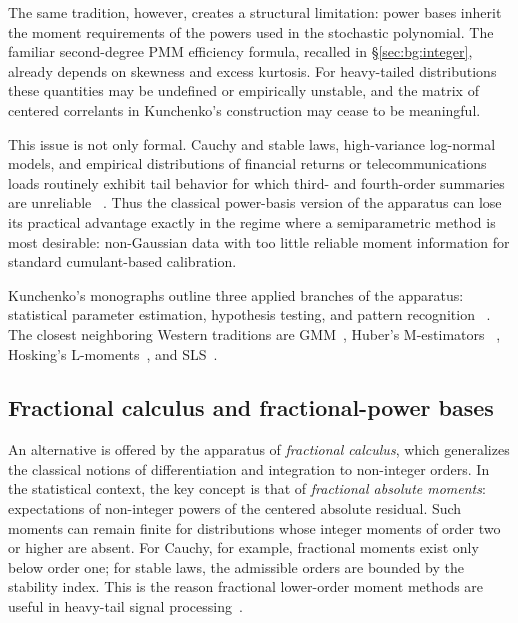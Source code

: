 \documentclass[11pt]{article}
\theoremstyle{definition}
\begin{document}
The same tradition, however, creates a structural limitation: power bases
inherit the moment requirements of the powers used in the stochastic
polynomial. The familiar second-degree PMM efficiency formula, recalled in
\S\ref{sec:bg:integer}, already depends on skewness and excess kurtosis. For
heavy-tailed distributions these quantities may be undefined or empirically
unstable, and the matrix of centered correlants in Kunchenko's construction
may cease to be meaningful.

This issue is not only formal. Cauchy and stable laws, high-variance
log-normal models, and empirical distributions of financial returns or
telecommunications loads routinely exhibit tail behavior for which third- and
fourth-order summaries are unreliable
~\citep{samorodnitsky1994stable,nolan2020stable,shao1993signal}.
Thus the classical power-basis version of the apparatus can lose its practical
advantage exactly in the regime where a semiparametric method is most
desirable: non-Gaussian data with too little reliable moment information for
standard cumulant-based calibration.

Kunchenko's monographs outline three applied branches of the apparatus:
statistical parameter estimation, hypothesis testing, and pattern recognition
~\citep{kunchenko2002,kunchenko2006stochastic}. The closest neighboring
Western traditions are GMM~\citep{hansen1982gmm}, Huber's M-estimators
~\citep{huber1981robust}, Hosking's L-moments~\citep{hosking1990lmoments},
and SLS~\citep{wang2008sls}.

\subsection{Fractional calculus and fractional-power bases}\label{sec:intro:fractional}

An alternative is offered by the apparatus of \emph{fractional calculus},
which generalizes the classical notions of differentiation and integration to
non-integer orders. In the
statistical context, the key concept is that of \emph{fractional absolute
moments}: expectations of non-integer powers of the centered absolute
residual. Such moments can remain finite for distributions whose integer
moments of order two or higher are absent. For Cauchy, for example,
fractional moments exist only below order one; for stable laws, the admissible
orders are bounded by the stability index. This is the reason fractional
lower-order moment methods are useful in heavy-tail signal
processing~\citep{matsui2013fracmoments,nolan2020stable}.
\end{document}
